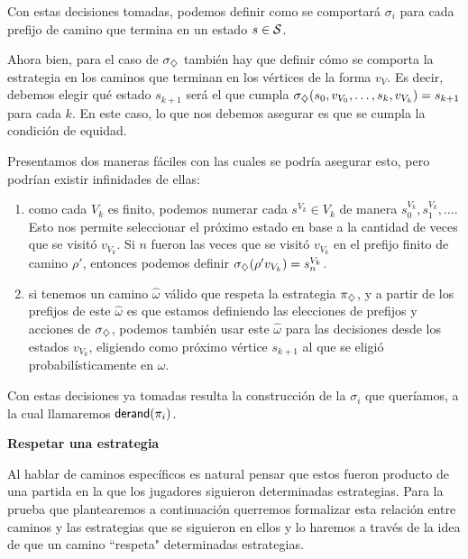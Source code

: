 Con estas decisiones tomadas, podemos definir como se comportará $\sigma_i$
para cada prefijo de camino que termina en un estado $s \in \mathcal{S}$.

Ahora bien, para el caso de $\sigma_\diamondsuit$ también hay que definir cómo se
comporta la estrategia en los caminos que terminan en los vértices de la forma
$v_V$. Es decir, debemos elegir qué estado $s_{k+1}$ será el que cumpla
$\sigma_\diamondsuit(s_0, v_{V_0}, \dots, s_k, v_{V_k}) = s_{k+1}$ para cada $k$. En
este caso, lo que nos debemos asegurar es que se cumpla la condición de
equidad.

\begin{boxgris}{}
	Presentamos dos maneras fáciles con las cuales se podría asegurar esto, pero
	podrían existir infinidades de ellas:
	\begin{enumerate}
		\item como cada $V_k$ es finito, podemos numerar cada $s^{V_k} \in V_k$ de manera
		      $s_0^{V_k}, s_1^{V_k}, \dots$. Esto nos permite seleccionar el próximo estado
		      en base a la cantidad de veces que se visitó $v_{V_k}$. Si $n$ fueron las veces
		      que se visitó $v_{V_k}$ en el prefijo finito de camino $\rho '$, entonces
		      podemos definir $\sigma_\diamondsuit(\rho ' v_{V_k}) = s_n^{V_k}$.
		\item si tenemos un camino $\hat \omega$ válido que respeta la estrategia
		      $\pi_\diamondsuit$, y a partir de los prefijos de este $\hat \omega$ es que estamos
		      definiendo las elecciones de prefijos y acciones de $\sigma_\diamondsuit$, podemos
		      también usar este $\hat \omega$ para las decisiones desde los estados
		      $v_{V_k}$, eligiendo como próximo vértice $s_{k+1}$ al que se eligió
		      probabilísticamente en $\hat \omega$.
	\end{enumerate}
\end{boxgris}

Con estas decisiones ya tomadas resulta la construcción de la $\sigma_i$ que
queríamos, a la cual llamaremos $\textsf{derand}(\pi_i)$.

\textbf{Respetar una estrategia}

Al hablar de caminos específicos es natural pensar que estos fueron producto de
una partida en la que los jugadores siguieron determinadas estrategias. Para la
prueba que plantearemos a continuación querremos formalizar esta relación entre
caminos y las estrategias que se siguieron en ellos y lo haremos a través de la
idea de que un camino ``respeta" determinadas estrategias.

